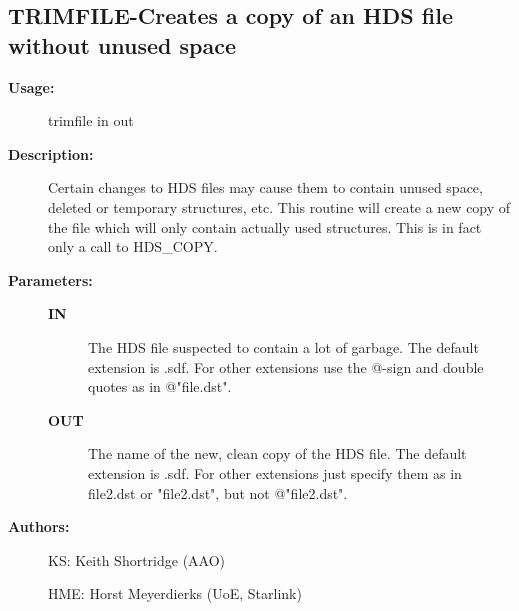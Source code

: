\subsection{TRIMFILE-\label{TRIMFILE}Creates a copy of an HDS file without unused space}
\begin{description}

\item [\textbf{Usage:}]
 trimfile in out

\item [\textbf{Description:}]
 Certain changes to HDS files may cause them to contain unused
 space, deleted or temporary structures, etc. This routine will
 create a new copy of the file which will only contain actually
 used structures.  This is in fact only a call to HDS\_COPY.

\item [\textbf{Parameters:}]
\begin{description}
\item [\textbf{IN}]
 The HDS file suspected to contain a lot of garbage. The default
 extension is .sdf. For other extensions use the @-sign and
 double quotes as in @"file.dst".
\item [\textbf{OUT}]
 The name of the new, clean copy of the HDS file. The default
 extension is .sdf. For other extensions just specify them as in
 file2.dst or "file2.dst", but not @"file2.dst".
\end{description}

\item [\textbf{Authors:}]
 KS: Keith Shortridge (AAO)

 HME: Horst Meyerdierks (UoE, Starlink)
\end{description}

